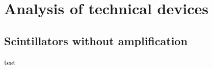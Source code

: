 \section{Analysis of technical devices}
\subsection{Scintillators without amplification}
test
\newpage

